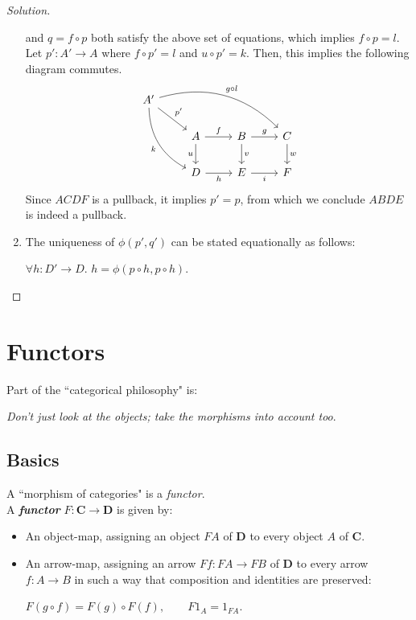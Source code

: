 \documentclass[]{amsbook}
\newcommand{\qq}{\qquad}
\newcommand{\catname}[1]{\mathbf{#1}}
\newcommand{\0}{\mathbf{0}}
\newcommand{\1}{\mathbf{1}}
\newenvironment{solution}
    {\begin{proof}[Solution]}{\end{proof}}
\begin{document}
\begin{solution}
\begin{enumerate}
    and $q = f \circ p$ both satisfy the above set of equations, which implies
    $f \circ p = l$. Let $p' : A' \to A$ where $f \circ p' = l$ and $u \circ p'
    = k$. Then, this implies the following diagram commutes.
    \[
    \begin{tikzcd}
        A' \arrow[ddr, swap, bend right, "k"]
        \arrow[drrr, bend left, "g \circ l"]
        \arrow[dr, "p'"]
        & & & \\
        & A \arrow[r, "f"]
        \arrow[d, swap, "u"]
        & B \arrow[r, "g"]
        \arrow[d, "v"]
        & C \arrow[d, "w"] \\
        & D \arrow[r, swap, "h"]
        & E \arrow[r, swap, "i"]
        & F
    \end{tikzcd}
    \]
    Since $ACDF$ is a pullback, it implies $p' = p$, from which we conclude
    $ABDE$ is indeed a pullback.

    \item The uniqueness of $\phi(p', q')$ can be stated equationally as
    follows:
    \begin{center}
        $\forall h: D' \to D. \,\, h = \phi(p \circ h, p \circ h)$.
    \end{center}
\end{enumerate}
\end{solution}

\section{Functors}
Part of the ``categorical philosophy" is:
\begin{center}
    \emph{Don't just look at the objects; take the morphisms into account too}.
\end{center}

\subsection*{Basics}
A ``morphism of categories" is a \emph{functor}.\\

A \emph{\textbf{functor}} $F: \catname{C} \to \catname{D}$ is given by:
\begin{itemize}
    \item An object-map, assigning an object $FA$ of $\catname{D}$ to every
    object $A$ of $\catname{C}$.
    \item An arrow-map, assigning an arrow $Ff : FA \to FB$ of $\catname{D}$ to
    every arrow $f: A \to B$ in such a way that composition and identities are
    preserved:
    \begin{center}
        $F(g \circ f) = F(g) \circ F(f), \qq F1_A = 1_{FA}$.
    \end{center}
\end{itemize}
\end{document}
